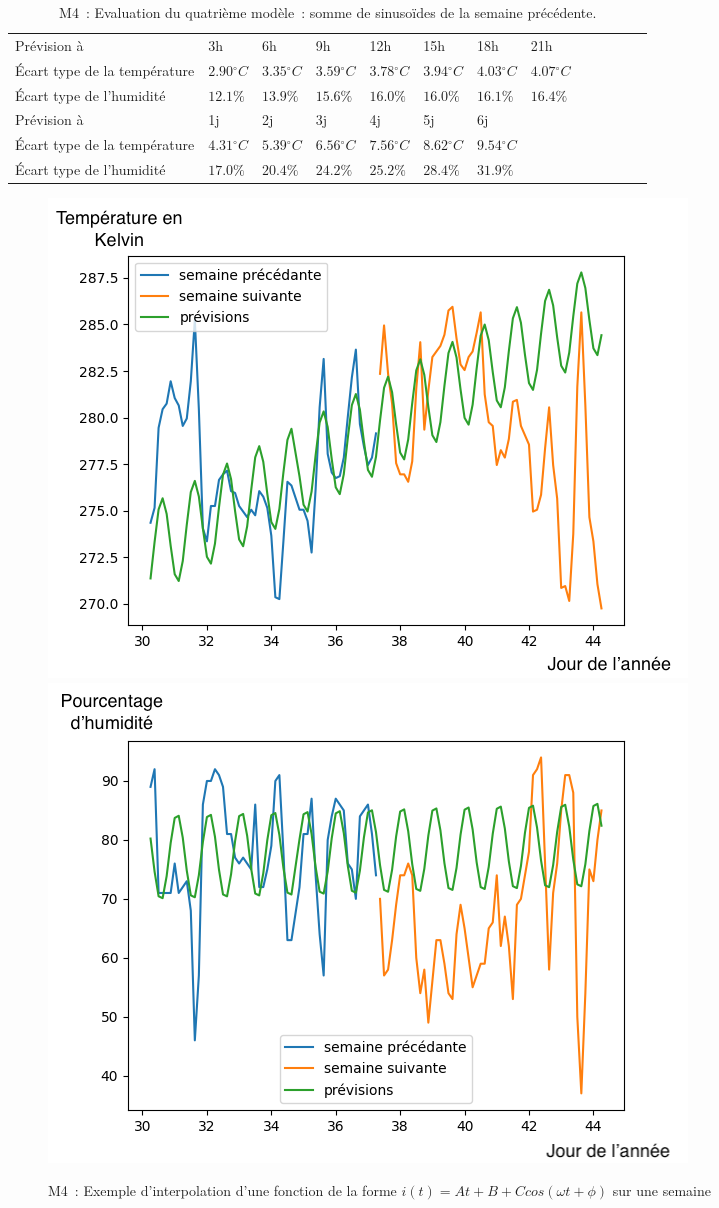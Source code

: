 \documentclass[11pt,a4paper]{article}
\begin{document}
\begin{table}[h]
\begin{center}
\begin{tabular}{lllllllllllll}\hline
\hline
Prévision à                  &3h                         &6h                        &9h                           &12h                         &15h                          &18h          &         21h      \\
Écart type de la température& $2.90{}^{\circ}C$& $3.35{}^{\circ}C$& $3.59{}^{\circ}C$& $3.78{}^{\circ}C$& $3.94{}^{\circ}C$& $4.03{}^{\circ}C$&$4.07{}^{\circ}C$\\
Écart type de l'humidité &$12.1\%$ & $13.9\%$ & $15.6\%$ & $16.0\%$ & $16.0\%$ & $16.1\%$ & $16.4\%$  \\
\hline
Prévision à                  & 1j &           2j            &3j            &4j          &5j            & 6j & \\
Écart type de la température&$4.31{}^{\circ}C$&$5.39{}^{\circ}C$&$6.56{}^{\circ}C$&$7.56{}^{\circ}C$&$8.62{}^{\circ}C$&$9.54{}^{\circ}C$ \\
Écart type de l'humidité      & $17.0\%$ &  $ 20.4\% $         &  $ 24.2\% $         &  $ 25.2\% $        &  $ 28.4\% $         &  $ 31.9\% $  \\
\hline 
\end{tabular}
\caption{M4~: Evaluation du quatrième modèle~: somme de sinusoïdes de la semaine précédente.}\label{tab:sinusoidesSP}
\end{center}
\end{table}
	
\begin{figure} [H]
\centering
\includegraphics[width=0.48 \textwidth]{imagesTIPE/cosDS.png}\quad
\includegraphics[width=0.48 \textwidth]{imagesTIPE/cosDSH.png}
\caption{\label{fig:cosDS} M4~: Exemple d'interpolation d'une fonction de la forme $i(t) = At +B + C cos (\omega t + \phi)$ sur une semaine}
\end{figure}
\end{document}
